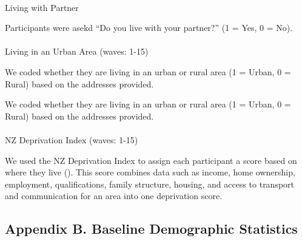 \documentclass[
  singlecolumn]{article}
\makeatletter
\let\oldparagraph\paragraph
\renewcommand{\paragraph}{
    \@ifstar
      \xxxParagraphStar
      \xxxParagraphNoStar
  }
\newcommand{\xxxParagraphStar}[1]{\oldparagraph*{#1}\mbox{}}
\newcommand{\xxxParagraphNoStar}[1]{\oldparagraph{#1}\mbox{}}
\makeatother
\begin{document}
\paragraph{Living with Partner}\label{living-with-partner}

Participants were asekd ``Do you live with your partner?'' (1 = Yes, 0 =
No).

\paragraph{Living in an Urban Area (waves:
1-15)}\label{living-in-an-urban-area-waves-1-15}

We coded whether they are living in an urban or rural area (1 = Urban, 0
= Rural) based on the addresses provided.

We coded whether they are living in an urban or rural area (1 = Urban, 0
= Rural) based on the addresses provided.

\paragraph{NZ Deprivation Index (waves:
1-15)}\label{nz-deprivation-index-waves-1-15}

We used the NZ Deprivation Index to assign each participant a score
based on where they live (). This score combines data such as income, home ownership,
employment, qualifications, family structure, housing, and access to
transport and communication for an area into one deprivation score.

\subsection{Appendix B. Baseline Demographic
Statistics}\label{appendix-demographics}
\end{document}
